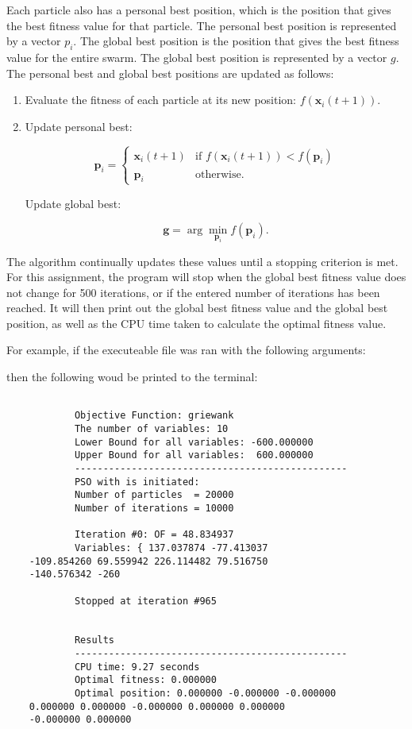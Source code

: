 \documentclass[12pt]{article}
\begin{document}
	
	Each particle also has a personal best position, which is the position that gives the best fitness value for that particle. The personal best position is represented by a vector \(p_i\). The global best position is the position that gives the best fitness value for the entire swarm. The global best position is represented by a vector \(g\). The personal best and global best positions are updated as follows:
	
	\begin{enumerate}
		\item Evaluate the fitness of each particle at its new position: \(f(\mathbf{x}_i(t+1))\).
		
		\item Update personal best:
		
		\[
		\mathbf{p}_i = 
		\begin{cases} 
			\mathbf{x}_i(t+1) & \text{if } f(\mathbf{x}_i(t+1)) < f(\mathbf{p}_i) \\
			\mathbf{p}_i & \text{otherwise.}
		\end{cases}
		\]
		
		Update global best:
		
		\[
		\mathbf{g} = \arg\min_{\mathbf{p}_i} f(\mathbf{p}_i).
		\]
	\end{enumerate}
	
	
	The algorithm continually updates these values until a stopping criterion is met. For this assignment, the program will stop when the global best fitness value does not change for 500 iterations, or if the entered number of iterations has been reached. It will then print out the global best fitness value and the global best position, as well as the CPU time taken to calculate the optimal fitness value.
	


    For example, if the executeable file was ran with the following arguments:
    
    
    then the following woud be printed to the terminal:
	
	\begin{mdframed}[style=myboxstyleTerminal1]
		\footnotesize
		\begin{verbatim}
			
			Objective Function: griewank
			The number of variables: 10
			Lower Bound for all variables: -600.000000
			Upper Bound for all variables:  600.000000
			------------------------------------------------
			PSO with is initiated:
			Number of particles  = 20000
			Number of iterations = 10000

			Iteration #0: OF = 48.834937
			Variables: { 137.037874 -77.413037 
    -109.854260 69.559942 226.114482 79.516750 
    -140.576342 -260

			Stopped at iteration #965

			
			Results
			------------------------------------------------
			CPU time: 9.27 seconds
			Optimal fitness: 0.000000
			Optimal position: 0.000000 -0.000000 -0.000000
    0.000000 0.000000 -0.000000 0.000000 0.000000
    -0.000000 0.000000
		\end{verbatim}
	\end{mdframed}
	
\end{document}
